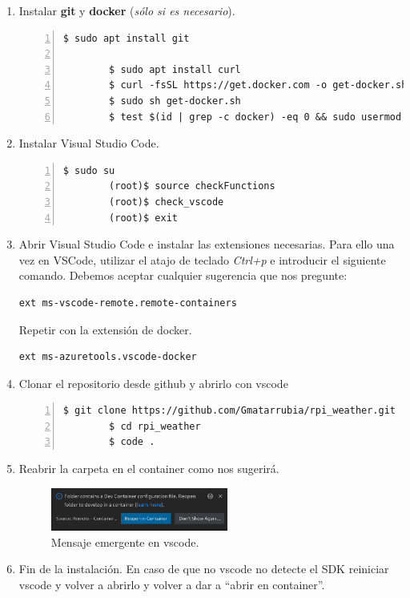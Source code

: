 \begin{enumerate}
    \item Instalar \textbf{\gls{git}} y \textbf{docker} (\emph{sólo si es necesario}).
    \begin{lstlisting}[style=consola, numbers=left]
        $ sudo apt install git

        $ sudo apt install curl
        $ curl -fsSL https://get.docker.com -o get-docker.sh
        $ sudo sh get-docker.sh
        $ test $(id | grep -c docker) -eq 0 && sudo usermod -aG docker $(whoami)
    \end{lstlisting}

    \item Instalar Visual Studio Code.
    \begin{lstlisting}[style=consola, numbers=left]
        $ sudo su
        (root)$ source checkFunctions
        (root)$ check_vscode
        (root)$ exit
    \end{lstlisting}

    \item Abrir Visual Studio Code e instalar las extensiones necesarias. Para ello
    una vez en VSCode, utilizar el atajo de teclado \emph{Ctrl+p} e introducir el siguiente
    comando. Debemos aceptar cualquier sugerencia que nos pregunte:
    \begin{lstlisting}[style=cmd]
        ext ms-vscode-remote.remote-containers
    \end{lstlisting}
    Repetir con la extensión de docker.
    \begin{lstlisting}[style=cmd]
        ext ms-azuretools.vscode-docker
    \end{lstlisting}

    \item Clonar el repositorio desde github y abrirlo con \gls{vscode}
    \begin{lstlisting}[style=consola, numbers=left]
        $ git clone https://github.com/Gmatarrubia/rpi_weather.git
        $ cd rpi_weather
        $ code .
    \end{lstlisting}

    \item Reabrir la carpeta en el container como nos sugerirá.
    \begin{figure}[H]
        \centering
        \includegraphics[width=0.55\textwidth]{imgs/dev-container}
        \caption[Mensaje emergente en vscode]{Mensaje emergente en vscode.}
        \label{imgs:vscode-devcontainer}
    \end{figure}

    \item Fin de la instalación. En caso de que no \gls{vscode} no detecte el \gls{SDK}
    reiniciar \gls{vscode} y volver a abrirlo y volver a dar a ``abrir en container''.
\end{enumerate}

